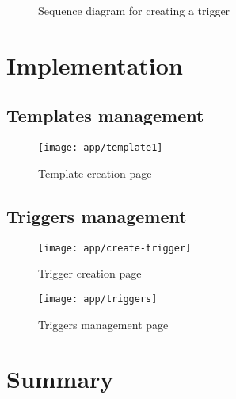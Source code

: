 \begin{landscape}
    \begin{figure}[hbt!]
        \centering
        
        \caption{Sequence diagram for creating a trigger}
        \label{seq-create-trigger}
    \end{figure}
\end{landscape}

\section{Implementation}

\subsection{Templates management}
\begin{figure}[hbt!]
    \centering
    \texttt{[image: app/template1]}
    \caption{Template creation page}
    \label{ss-template}
\end{figure}

\subsection{Triggers management}

\begin{figure}[hbt!]
    \centering
    \texttt{[image: app/create-trigger]}
    \caption{Trigger creation page}
    \label{ss-create-trigger}
\end{figure}

\begin{figure}[hbt!]
    \centering
    \texttt{[image: app/triggers]}
    \caption{Triggers management page}
    \label{ss-triggers}
\end{figure}


\section*{Summary}

